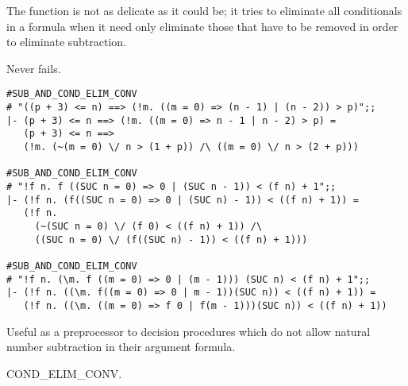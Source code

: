 The function is not as delicate as it could be; it tries to eliminate all
conditionals in a formula when it need only eliminate those that have to be
removed in order to eliminate subtraction.

\FAILURE
Never fails.

\EXAMPLE
{\par\samepage\setseps\small
\begin{verbatim}
#SUB_AND_COND_ELIM_CONV
# "((p + 3) <= n) ==> (!m. ((m = 0) => (n - 1) | (n - 2)) > p)";;
|- (p + 3) <= n ==> (!m. ((m = 0) => n - 1 | n - 2) > p) =
   (p + 3) <= n ==>
   (!m. (~(m = 0) \/ n > (1 + p)) /\ ((m = 0) \/ n > (2 + p)))

#SUB_AND_COND_ELIM_CONV
# "!f n. f ((SUC n = 0) => 0 | (SUC n - 1)) < (f n) + 1";;
|- (!f n. (f((SUC n = 0) => 0 | (SUC n) - 1)) < ((f n) + 1)) =
   (!f n.
     (~(SUC n = 0) \/ (f 0) < ((f n) + 1)) /\
     ((SUC n = 0) \/ (f((SUC n) - 1)) < ((f n) + 1)))

#SUB_AND_COND_ELIM_CONV
# "!f n. (\m. f ((m = 0) => 0 | (m - 1))) (SUC n) < (f n) + 1";;
|- (!f n. ((\m. f((m = 0) => 0 | m - 1))(SUC n)) < ((f n) + 1)) =
   (!f n. ((\m. ((m = 0) => f 0 | f(m - 1)))(SUC n)) < ((f n) + 1))
\end{verbatim}
}
\USES
Useful as a preprocessor to decision procedures which do not allow natural
number subtraction in their argument formula.

\SEEALSO
COND_ELIM_CONV.

\ENDDOC
